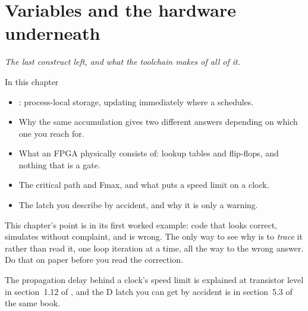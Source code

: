 
\chapter{Variables and the hardware underneath}
\label{c5:ch}

{\large\itshape The last construct left, and what the toolchain makes of all of it.\par}

\begin{chapterbox}{In this chapter}
\begin{itemize}
  \item {}: process-local storage, updating immediately where a 
    schedules.
  \item Why the same accumulation gives two different answers depending on which one you reach for.
  \item What an FPGA physically consists of: lookup tables and flip-flops, and nothing that is a
    gate.
  \item The critical path and Fmax, and what puts a speed limit on a clock.
  \item The latch you describe by accident, and why it is only a warning.
\end{itemize}
\end{chapterbox}

This chapter's point is in its first worked example: code that looks correct, simulates without
complaint, and is wrong. The only way to see why is to \emph{trace} it rather than read it, one
loop iteration at a time, all the way to the wrong answer. Do that on paper before you read the
correction.

\note[Refresher] The propagation delay behind a clock's speed limit is explained at transistor level
in section~1.12 of \debook{}, and the D latch you can get by accident is in section~5.3 of the same
book.




